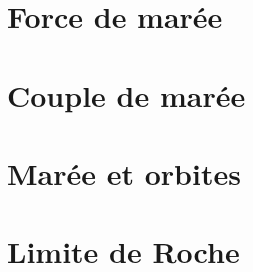 \documentclass[a4paper,DIV16,10pt]{scrartcl}
\begin{document}
 \inidoc



\newpage
\section{Force de marée}


\newpage
\section{Couple de marée}


\newpage
\section{Marée et orbites}


\newpage
\section{Limite de Roche}


%

%

%

%
\end{document}
